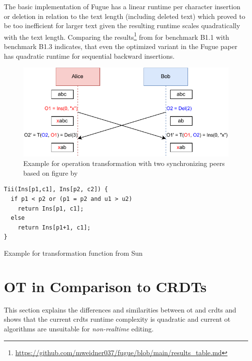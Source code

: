 The basic implementation of Fugue has a linear runtime per character insertion or deletion in relation to the text length (including deleted text) which proved to be too inefficient for larger text given the resulting runtime scales quadratically with the text length. Comparing the results\footnote{\url{https://github.com/mweidner037/fugue/blob/main/results_table.md}} from  for benchmark B1.1 with benchmark B1.3 indicates, that even the optimized variant in the Fugue paper has quadratic runtime for sequential backward insertions.

\clearpage

\begin{figure}
  \centering
  \includegraphics[width=\textwidth]{figures/ot.drawio.pdf}
  \caption{Example for operation transformation with two synchronizing peers based on figure by  \cite[Section 1.4 Figure 1]{2024-sun-ot-faq}}
  \label{fig:ot-example}
\end{figure}

\begin{listing}
  \begin{verbatim}
Tii(Ins[p1,c1], Ins[p2, c2]) {
  if p1 < p2 or (p1 = p2 and u1 > u2)
    return Ins[p1, c1];              
  else
    return Ins[p1+1, c1];
}
\end{verbatim}
  \caption{Example for transformation function from Sun \cite[Section 2.15]{2024-sun-ot-faq}}
  \label{lst:example-transformation-function}
\end{listing}

\clearpage

\section{OT in Comparison to CRDTs} \label{chapter:ot}

This section explains the differences and similarities between \gls{ot} and \glspl{crdt} and shows that the current \glspl{crdt} runtime complexity is quadratic and current \gls{ot} algorithms are unsuitable for \textit{non-realtime} editing.

